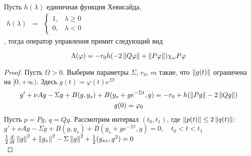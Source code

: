 \begin{remark}
Пусть $h(\lambda)$ единичная функция Хевисайда, \\
$
    \begin{matrix}
    h(\lambda) & =
    & \left\{
    \begin{matrix}
    1, & \lambda \ge 0 \\
    0, & \lambda < 0
    \end{matrix} \right.
    \end{matrix}
$\\

, тогда оператор управления примит следующий вид

\begin{equation}
    \Lambda(\varphi) = -r_0 h(-2\left\lVert Q\varphi\right\rVert +
    \left\lVert P\varphi\right\rVert)\chi_{\omega}P\varphi
\end{equation}

\end{remark}


\begin{proof}
    Пусть $\Omega > 0$. Выберим параметры $\Sigma$, $r_0$, $m$ такие, что
    $\left\lVert g(t)\right\rVert$ ограничена на $[0, +\infty)$. Здесь $g(t) = \varphi(t)e^{\Sigma t}$\\

    \begin{gather}
        g' + \nu Ag - \Sigma g + B(g, y_s) + B(y_s + ge^{-\Sigma t}, g) = -r_0 +
    h(\left\lVert Pg\right\rVert - 2 \left\lVert Qg\right\rVert)\\*
        g(0) = \varphi_0
    \end{gather}
    Пусть $p = Pg$, $q = Qg$. Рассмотрим интервал $(t_0, t_1)$, где $\left\lVert p(t)\right\rVert
    \le 2 \left\lVert q(t)\right\rVert$:\\
    $g' + \nu Ag - \Sigma g + B(g, y_s) + B(y_s + ge^{-\Sigma t}, g) = 0, \quad
    t_0 < t < t_1$\\
    $\frac{1}{2}\frac{d}{dt}\left\lVert g\right\rVert^2 + \left\lVert g_x\right\rVert^2 - \Sigma \left\lVert g\right\rVert^2 +
    \frac{1}{2}(y_{sx}, g^2) = 0$\\


\end{proof}




